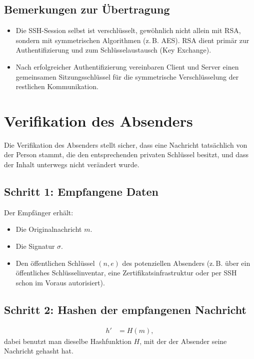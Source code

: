 \documentclass[a4paper,11pt]{article}
\begin{document}
\subsection{Bemerkungen zur Übertragung}
\begin{itemize}
  \item Die SSH-Session selbst ist verschlüsselt, gewöhnlich nicht allein mit RSA, sondern mit symmetrischen Algorithmen (z.\,B. AES). RSA dient primär zur Authentifizierung und zum Schlüsselaustausch (Key Exchange).
  \item Nach erfolgreicher Authentifizierung vereinbaren Client und Server einen gemeinsamen Sitzungsschlüssel für die symmetrische Verschlüsselung der restlichen Kommunikation.
\end{itemize}

\section{Verifikation des Absenders}
\label{sec:verifikation}
Die Verifikation des Absenders stellt sicher, dass eine Nachricht tatsächlich von der Person stammt, die den entsprechenden privaten Schlüssel besitzt, und dass der Inhalt unterwegs nicht verändert wurde.

\subsection{Schritt 1: Empfangene Daten}
Der Empfänger erhält:
\begin{itemize}
  \item Die Originalnachricht \(m\).
  \item Die Signatur \(\sigma\).
  \item Den öffentlichen Schlüssel \((n, e)\) des potenziellen Absenders (z.\,B. über ein öffentliches Schlüsselinventar, eine Zertifikatsinfrastruktur oder per SSH schon im Voraus autorisiert).
\end{itemize}

\subsection{Schritt 2: Hashen der empfangenen Nachricht}
\begin{align*}
  h' &= H(m),
\end{align*}
dabei benutzt man dieselbe Hashfunktion \(H\), mit der der Absender seine Nachricht gehasht hat.
\end{document}
